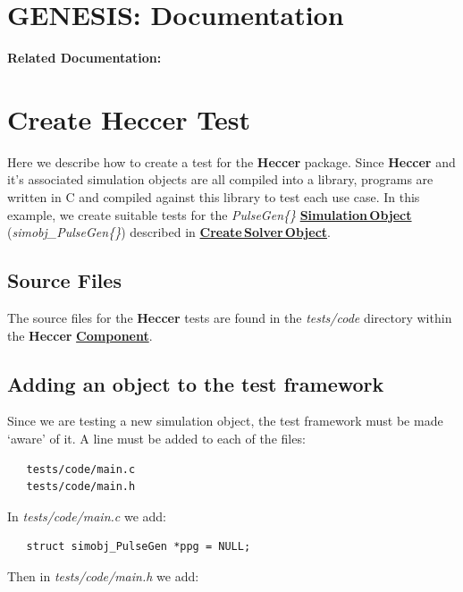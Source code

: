 \documentclass[12pt]{article}
\begin{document}
\section*{GENESIS: Documentation}

{\bf Related Documentation:}

\section*{Create Heccer Test}

Here we describe how to create a test for the {\bf Heccer} package. Since {\bf Heccer} and it's associated simulation objects are all compiled into a library, programs are written in C and compiled against this library to test each use case. In this example, we create suitable tests for the {\it PulseGen\{\}} \href{../simulation-objects/simulation-objects.tex}{\bf Simulation\,Object} ({\it simobj\_PulseGen\{\}}) described in \href{../genesis-add-object-solver/genesis-add-object-solver.tex}{\bf Create\,Solver\,Object}.

\subsection*{Source Files}

The source files for the {\bf Heccer} tests are found in the {\it tests/code} directory within the {\bf Heccer} \href{../reserved-words/reserved-words.tex}{\bf Component}.

\subsection*{Adding an object to the test framework}

Since we are testing a new simulation object, the test framework must be made `aware' of it. A line must be added to each of the files:
\begin{verbatim}
   tests/code/main.c
   tests/code/main.h
\end{verbatim}

In {\it tests/code/main.c} we add:

\begin{verbatim}
   struct simobj_PulseGen *ppg = NULL;
\end{verbatim}

Then in {\it tests/code/main.h} we add:
\end{document}
